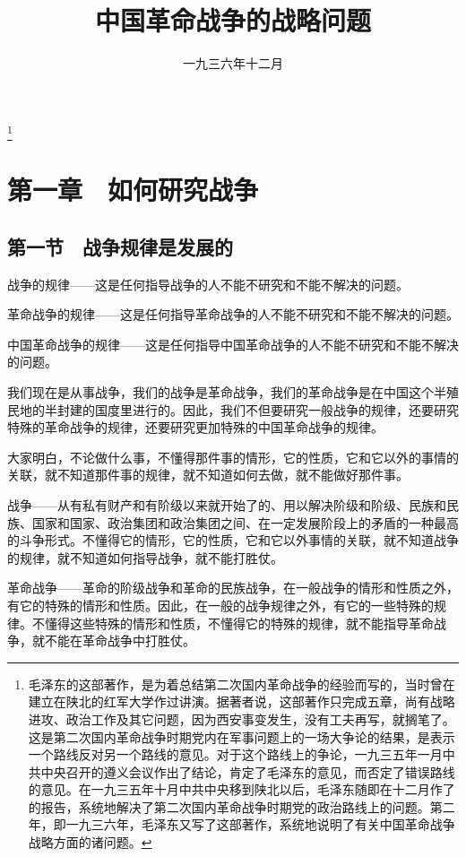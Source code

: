 
\title{中国革命战争的战略问题}
\date{一九三六年十二月}
\thanks{毛泽东的这部著作，是为着总结第二次国内革命战争的经验而写的，当时曾在建立在陕北的红军大学作过讲演。据著者说，这部著作只完成五章，尚有战略进攻、政治工作及其它问题，因为西安事变发生，没有工夫再写，就搁笔了。这是第二次国内革命战争时期党内在军事问题上的一场大争论的结果，是表示一个路线反对另一个路线的意见。对于这个路线上的争论，一九三五年一月中共中央召开的遵义会议作出了结论，肯定了毛泽东的意见，而否定了错误路线的意见。在一九三五年十月中共中央移到陕北以后，毛泽东随即在十二月作了的报告，系统地解决了第二次国内革命战争时期党的政治路线上的问题。第二年，即一九三六年，毛泽东又写了这部著作，系统地说明了有关中国革命战争战略方面的诸问题。}
\maketitle


\section{第一章　如何研究战争}

\subsection{第一节　战争规律是发展的}

战争的规律——这是任何指导战争的人不能不研究和不能不解决的问题。

革命战争的规律——这是任何指导革命战争的人不能不研究和不能不解决的问题。

中国革命战争的规律——这是任何指导中国革命战争的人不能不研究和不能不解决的问题。

我们现在是从事战争，我们的战争是革命战争，我们的革命战争是在中国这个半殖民地的半封建的国度里进行的。因此，我们不但要研究一般战争的规律，还要研究特殊的革命战争的规律，还要研究更加特殊的中国革命战争的规律。

大家明白，不论做什么事，不懂得那件事的情形，它的性质，它和它以外的事情的关联，就不知道那件事的规律，就不知道如何去做，就不能做好那件事。

战争——从有私有财产和有阶级以来就开始了的、用以解决阶级和阶级、民族和民族、国家和国家、政治集团和政治集团之间、在一定发展阶段上的矛盾的一种最高的斗争形式。不懂得它的情形，它的性质，它和它以外事情的关联，就不知道战争的规律，就不知道如何指导战争，就不能打胜仗。

革命战争——革命的阶级战争和革命的民族战争，在一般战争的情形和性质之外，有它的特殊的情形和性质。因此，在一般的战争规律之外，有它的一些特殊的规律。不懂得这些特殊的情形和性质，不懂得它的特殊的规律，就不能指导革命战争，就不能在革命战争中打胜仗。

